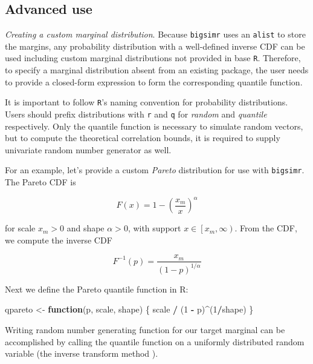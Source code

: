 \documentclass[]{article}
\newenvironment{Shaded}{\begin{snugshade}}{\end{snugshade}}
\newcommand{\ControlFlowTok}[1]{\textcolor[rgb]{0.13,0.29,0.53}{\textbf{#1}}}
\newcommand{\DecValTok}[1]{\textcolor[rgb]{0.00,0.00,0.81}{#1}}
\newcommand{\NormalTok}[1]{#1}
\newcommand{\OperatorTok}[1]{\textcolor[rgb]{0.81,0.36,0.00}{\textbf{#1}}}
\newcommand{\StringTok}[1]{\textcolor[rgb]{0.31,0.60,0.02}{#1}}
\begin{document}
\hypertarget{advanced-use}{%
\subsection{Advanced use}\label{advanced-use}}

\emph{Creating a custom marginal distribution}.
Because \texttt{bigsimr} uses an \texttt{alist} to store the margins, any probability distribution with a well-defined inverse CDF can be used including custom marginal distributions not provided in base \texttt{R}.
Therefore, to specify a marginal distribution absent from an existing package, the user needs to provide a closed-form expression to form the corresponding quantile function.

It is important to follow \texttt{R}'s naming convention for probability distributions.
Users should prefix distributions with \texttt{r} and \texttt{q} for \emph{random} and \emph{quantile} respectively.
Only the quantile function is necessary to simulate random vectors, but to compute the theoretical correlation bounds, it is required to supply univariate random number generator as well.

For an example, let's provide a custom \emph{Pareto} distribution for use with \texttt{bigsimr}.
The Pareto CDF is

\[
F(x) = 1 - \left(\frac{x_m}{x}\right)^\alpha
\]

for scale \(x_m > 0\) and shape \(\alpha > 0\), with support \(x \in \left[x_m, \infty\right)\).
From the CDF, we compute the inverse CDF

\[
F^{-1}(p) = \frac{x_m}{\left(1 - p\right)^{1/\alpha}}
\]

Next we define the Pareto quantile function in R:

\begin{Shaded}
\begin{Highlighting}[]
\NormalTok{qpareto <-}\StringTok{ }\ControlFlowTok{function}\NormalTok{(p, scale, shape) \{}
\NormalTok{  scale }\OperatorTok{/}\StringTok{ }\NormalTok{(}\DecValTok{1} \OperatorTok{-}\StringTok{ }\NormalTok{p)}\OperatorTok{^}\NormalTok{(}\DecValTok{1}\OperatorTok{/}\NormalTok{shape)}
\NormalTok{\}}
\end{Highlighting}
\end{Shaded}

Writing random number generating function for our target marginal can be accomplished by calling the quantile function on a uniformly distributed random variable (the inverse transform method \citet{Rizzo2007}).
\end{document}

